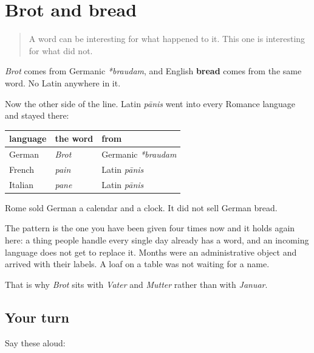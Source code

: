 \section[Brot und bread]{Brot and bread}

\label{lesson:GE-C11-brot-bread}



\begin{quote}
A word can be interesting for what happened to it. This one is interesting for what did not.
\end{quote}

\begin{cousinweb}
\emph{Brot} comes from Germanic \emph{*braudam}, and English \textbf{bread} comes from the same word. No Latin anywhere in it.

Now the other side of the line. Latin \emph{pānis} went into every Romance language and stayed there:

\noindent
\begin{tabularx}{\linewidth}{@{}>{\raggedright\arraybackslash}X>{\raggedright\arraybackslash}X>{\raggedright\arraybackslash}X@{}}
\toprule
\textbf{language} & \textbf{the word} & \textbf{from} \\
\midrule
German & \emph{Brot} & Germanic \emph{*braudam} \\
French & \emph{pain} & Latin \emph{pānis} \\
Italian & \emph{pane} & Latin \emph{pānis} \\
\bottomrule
\end{tabularx}
\end{cousinweb}

\begin{culture}
Rome sold German a calendar and a clock. It did not sell German bread.

The pattern is the one you have been given four times now and it holds again here: a thing people handle every single day already has a word, and an incoming language does not get to replace it. Months were an administrative object and arrived with their labels. A loaf on a table was not waiting for a name.

That is why \emph{Brot} sits with \emph{Vater} and \emph{Mutter} rather than with \emph{Januar}.
\end{culture}

\subsection*{Your turn}
Say these aloud:

